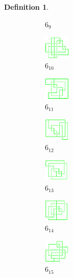 \documentclass{article}
\theoremstyle{definition}
\newtheorem{defn}[thm]{Definition}
\theoremstyle{theorem}
\theoremstyle{proposition}
\theoremstyle{corollary}
\begin{document}
\begin{defn}
\begin{figure}[H]
\begin{subfigure}{0.075\textwidth}
    \caption{$6_9$} 
    \end{subfigure}
    \begin{subfigure}{0.075\textwidth}
    \includegraphics[width=1.25cm]{../Midterm_Poster/grid_diagram/theta_6_10.png}
    \caption{$6_{10}$} 
    \end{subfigure}
    \begin{subfigure}{0.075\textwidth}
    \includegraphics[width=1.25cm]{../Midterm_Poster/grid_diagram/theta_6_11.png}
    \caption{$6_{11}$} 
    \end{subfigure}
    \begin{subfigure}{0.075\textwidth}
    \includegraphics[width=1.25cm]{../Midterm_Poster/grid_diagram/theta_6_12.png}
    \caption{$6_{12}$} 
    \end{subfigure}
    \begin{subfigure}{0.075\textwidth}
    \includegraphics[width=1.25cm]{../Midterm_Poster/grid_diagram/theta_6_13.png}
    \caption{$6_{13}$} 
    \end{subfigure}
    \begin{subfigure}{0.075\textwidth}
    \includegraphics[width=1.25cm]{../Midterm_Poster/grid_diagram/theta_6_14.png}
    \caption{$6_{14}$} 
    \end{subfigure}
    \begin{subfigure}{0.075\textwidth}
    \includegraphics[width=1.25cm]{../Midterm_Poster/grid_diagram/theta_6_15.png}
    \caption{$6_{15}$} 
    \end{subfigure}
    \begin{subfigure}{0.075\textwidth}

\end{subfigure}
\end{figure}
\end{defn}
\end{document}
